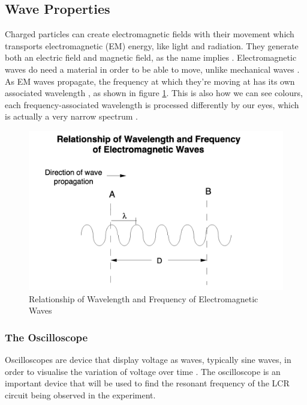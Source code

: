 \documentclass[12pt]{article}
\begin{document}
\subsection{Wave Properties} \label{sec:1.2}

Charged particles can create electromagnetic fields with their movement which transports
electromagnetic (EM) energy, like light and radiation.
They generate both an electric field and magnetic field, as the name implies
\cite{NASAemwave}.
Electromagnetic waves do need a material in order to be able to move, unlike mechanical waves
\cite{NASAemwave}.
As EM waves propagate, the frequency at which they're moving at has its own associated wavelength
\cite{NASAemradio}, as shown in figure \ref{fig:emrelation}. 
This is also how we can see colours, each frequency-associated wavelength is processed differently by our eyes,
which is actually a very narrow spectrum
\cite{emcolour}.

\begin{figure}[ht]
    \centering
    \includegraphics[width=15cm]{em wave relation.png}
    \caption{\centering Relationship of Wavelength and Frequency of Electromagnetic Waves \protect\cite{NASAemradio}}
    \label{fig:emrelation}
\end{figure}

\subsubsection{The Oscilloscope} \label{sec:1.2.1}

Oscilloscopes are device that display voltage as waves, typically sine waves, in order to visualise the variation of voltage over time
\cite{flukeoscillo,keyoscillo}.
The oscilloscope is an important device that will be used to find the resonant frequency of the LCR circuit being observed in the experiment.
\end{document}
